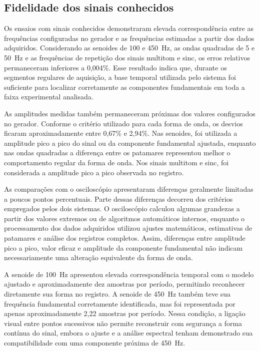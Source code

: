 \documentclass[a4paper,12pt]{fcte}
\begin{document}
\subsection{Fidelidade dos sinais conhecidos}
\label{subsec:discussao_fidelidade}

Os ensaios com sinais conhecidos demonstraram elevada correspondência entre as frequências configuradas no gerador e as frequências estimadas a partir dos dados adquiridos. Considerando as senoides de 100 e 450~Hz, as ondas quadradas de 5 e 50~Hz e as frequências de repetição dos sinais multitom e sinc, os erros relativos permaneceram inferiores a 0,004\%. Esse resultado indica que, durante os segmentos regulares de aquisição, a base temporal utilizada pelo sistema foi suficiente para localizar corretamente as componentes fundamentais em toda a faixa experimental analisada.

As amplitudes medidas também permaneceram próximas dos valores configurados no gerador. Conforme o critério utilizado para cada forma de onda, os desvios ficaram aproximadamente entre 0,67\% e 2,94\%. Nas senoides, foi utilizada a amplitude pico a pico do sinal ou da componente fundamental ajustada, enquanto nas ondas quadradas a diferença entre os patamares representou melhor o comportamento regular da forma de onda. Nos sinais multitom e sinc, foi considerada a amplitude pico a pico observada no registro.

As comparações com o osciloscópio apresentaram diferenças geralmente limitadas a poucos pontos percentuais. Parte dessas diferenças decorreu dos critérios empregados pelos dois sistemas. O osciloscópio calculou algumas grandezas a partir dos valores extremos ou de algoritmos automáticos internos, enquanto o processamento dos dados adquiridos utilizou ajustes matemáticos, estimativas de patamares e análise dos registros completos. Assim, diferenças entre amplitude pico a pico, valor eficaz e amplitude da componente fundamental não indicam necessariamente uma alteração equivalente da forma de onda.

A senoide de 100~Hz apresentou elevada correspondência temporal com o modelo ajustado e aproximadamente dez amostras por período, permitindo reconhecer diretamente sua forma no registro. A senoide de 450~Hz também teve sua frequência fundamental corretamente identificada, mas foi representada por apenas aproximadamente 2,22 amostras por período. Nessa condição, a ligação visual entre pontos sucessivos não permite reconstruir com segurança a forma contínua do sinal, embora o ajuste e a análise espectral tenham demonstrado sua compatibilidade com uma componente próxima de 450~Hz.
\end{document}
